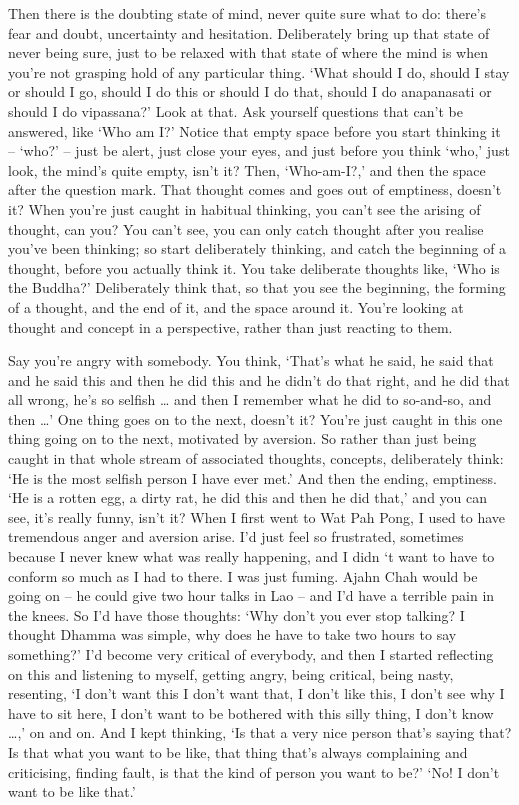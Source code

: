 Then there is the doubting state of mind, never quite sure what to do: there's fear and doubt, uncertainty and hesitation. Deliberately bring up that state of never being sure, just to be relaxed with that state of where the mind is when you're not grasping hold of any particular thing. `What should I do, should I stay or should I go, should I do this or should I do that, should I do anapanasati or should I do vipassana?' Look at that. Ask yourself questions that can't be answered, like `Who am I?' Notice that empty space before you start thinking it -- `who?' -- just be alert, just close your eyes, and just before you think `who,' just look, the mind's quite empty, isn't it? Then, `Who-am-I?,' and then the space after the question mark. That thought comes and goes out of emptiness, doesn't it? When you're just caught in habitual thinking, you can't see the arising of thought, can you? You can't see, you can only catch thought after you realise you've been thinking; so start deliberately thinking, and catch the beginning of a thought, before you actually think it. You take deliberate thoughts like, `Who is the Buddha?' Deliberately think that, so that you see the beginning, the forming of a thought, and the end of it, and the space around it. You're looking at thought and concept in a perspective, rather than just reacting to them.

Say you're angry with somebody. You think, `That's what he said, he said that and he said this and then he did this and he didn't do that right, and he did that all wrong, he's so selfish \ldots{} and then I remember what he did to so-and-so, and then \ldots{}' One thing goes on to the next, doesn't it? You're just caught in this one thing going on to the next, motivated by aversion. So rather than just being caught in that whole stream of associated thoughts, concepts, deliberately think: `He is the most selfish person I have ever met.' And then the ending, emptiness. `He is a rotten egg, a dirty rat, he did this and then he did that,' and you can see, it's really funny, isn't it? When I first went to Wat Pah Pong, I used to have tremendous anger and aversion arise. I'd just feel so frustrated, sometimes because I never knew what was really happening, and I didn `t want to have to conform so much as I had to there. I was just fuming. Ajahn Chah would be going on -- he could give two hour talks in Lao -- and I'd have a terrible pain in the knees. So I'd have those thoughts: `Why don't you ever stop talking? I thought Dhamma was simple, why does he have to take two hours to say something?' I'd become very critical of everybody, and then I started reflecting on this and listening to myself, getting angry, being critical, being nasty, resenting, `I don't want this I don't want that, I don't like this, I don't see why I have to sit here, I don't want to be bothered with this silly thing, I don't know \ldots{},' on and on. And I kept thinking, `Is that a very nice person that's saying that? Is that what you want to be like, that thing that's always complaining and criticising, finding fault, is that the kind of person you want to be?' `No! I don't want to be like that.'

